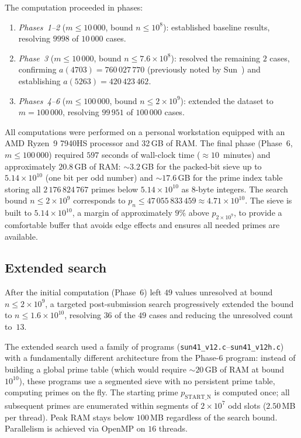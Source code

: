\documentclass[12pt]{article}
\begin{document}
	The computation proceeded in phases:
	\begin{enumerate}
		\item \emph{Phases~1--2} ($m \leq 10\,000$, bound $n \leq 10^8$):
		established baseline results, resolving $9998$ of $10\,000$ cases.
		\item \emph{Phase~3} ($m \leq 10\,000$,
		bound $n \leq 7.6 \times 10^8$):
		resolved the remaining $2$ cases, confirming
		$a(4703) = 760\,027\,770$ (previously noted by Sun~\cite{Sun2019})
		and establishing $a(5263) = 420\,423\,462$.
		\item \emph{Phases~4--6} ($m \leq 100\,000$,
		bound $n \leq 2 \times 10^9$):
		extended the dataset to $m = 100\,000$, resolving $99\,951$ of
		$100\,000$ cases.
	\end{enumerate}
	
	All computations were performed on a personal workstation equipped with
	an AMD Ryzen~9 7940HS processor and 32\,GB of RAM\@.
	The final phase (Phase~6, $m \leq 100\,000$) required $597$ seconds of
	wall-clock time ($\approx 10$~minutes) and approximately $20.8$\,GB of
	RAM: $\sim 3.2$\,GB for the packed-bit sieve up to
	$5.14 \times 10^{10}$ (one bit per odd number) and $\sim 17.6$\,GB for
	the prime index table storing all $2\,176\,824\,767$ primes below
	$5.14 \times 10^{10}$ as 8-byte integers.
	The search bound $n \leq 2 \times 10^9$ corresponds to
	$p_n \leq 47\,055\,833\,459 \approx 4.71 \times 10^{10}$.
	The sieve is built to $5.14 \times 10^{10}$, a margin of
	approximately $9\%$ above $p_{2 \times 10^9}$, to provide a
	comfortable buffer that avoids edge effects and ensures all needed
	primes are available.
	
	\subsection{Extended search}
	\label{sec:extended}

	After the initial computation (Phase~6) left $49$ values unresolved
	at bound $n \leq 2 \times 10^9$, a targeted post-submission search
	progressively extended the bound to $n \leq 1.6 \times 10^{10}$,
	resolving $36$ of the $49$ cases and reducing the unresolved count
	to~$13$.

	The extended search used a family of programs
	(\texttt{sun41\_v12.c}--\texttt{sun41\_v12h.c}) with a fundamentally
	different architecture from the Phase-6 program: instead of building
	a global prime table (which would require $\sim 20$\,GB of RAM at
	bound $10^{10}$), these programs use a segmented sieve with no
	persistent prime table, computing primes on the fly.
	The starting prime $p_{\mathrm{START\_N}}$ is computed once; all
	subsequent primes are enumerated within segments of
	$2 \times 10^7$ odd slots ($2.50$\,MB per thread).
	Peak RAM stays below $100$\,MB regardless of the search bound.
	Parallelism is achieved via OpenMP on $16$ threads.
\end{document}
